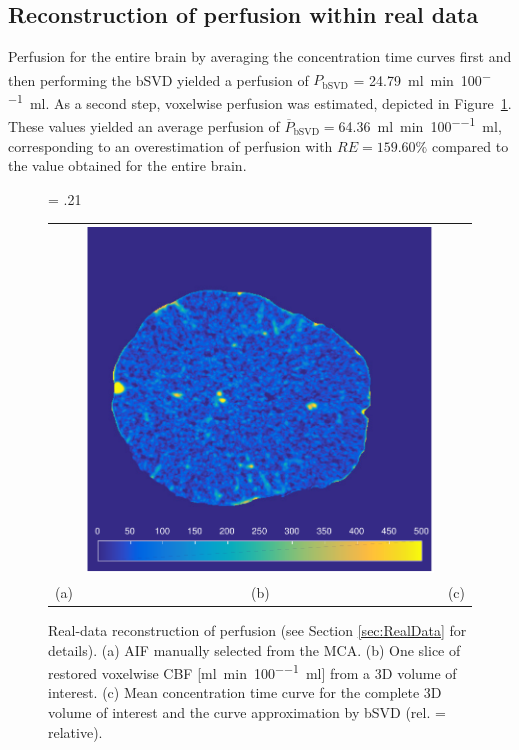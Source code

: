 \documentclass[aps,prb,article,groupedaddress,showkeys]{revtex4}
\begin{document}
	
	\subsection{Reconstruction of perfusion within real data}\label{sec:resultsrealdata}
	 Perfusion for the entire brain by averaging the concentration time curves first and then performing the bSVD yielded a perfusion of $P_{\mathrm{bSVD}}$ = \SI{24.79}{\milli\litre\per\minute\per100\milli\litre}. As a second step, voxelwise perfusion was estimated, depicted in Figure~\ref{fig:RealData}. These values yielded an average perfusion of $\overline{P}_{\mathrm{bSVD}} = $\SI{64.36}{\milli\litre\per\minute\per100\milli\litre}, corresponding to an overestimation of perfusion with $RE = 159.60\%$ compared to the value obtained for the entire brain.	


	\begin{figure}[!htb]
		\fwd = .21\textwidth
		\centering
		\begin{tabular}{ccc}
		 {\small} & \includegraphics[width = \fwd]{./figs/real_axial160.pdf} & {\small} \\
		 (a) & (b) & (c) 
		\end{tabular}
		\caption{Real-data reconstruction of perfusion (see Section \ref{sec:RealData} for details). (a) AIF manually selected from the MCA. (b) One slice of restored voxelwise CBF [\si{\milli\litre\per\minute\per100\milli\litre}] from a 3D volume of interest. (c) Mean concentration time curve for the complete 3D volume of interest and the curve approximation by bSVD (rel. = relative).}
	\label{fig:RealData}
	\end{figure}
\end{document}
